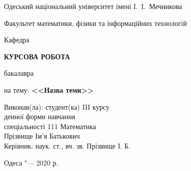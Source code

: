\thispagestyle{empty}

\begin{center}
Одеський національний університет імені І.~І.~Мечникова

Факультет математики, фізики та інформаційних технологій

Кафедра %
\end{center}

\vfill

\begin{center}
\large
\textbf{КУРСОВА РОБОТА}

бакалавра

\bigskip

на тему: \textbf{<<Назва теми>>}
\end{center}

\vspace{2cm}

\hfill
\begin{minipage}{0.6\textwidth}
Виконав(ла): студент(ка) III курсу\\
денної форми навчання\\
спеціальності 111 Математика\\ %
Прізвище Ім'я Батькович\\[3\jot]
Керівник: наук. ст., вч. зв. Прізвище І. Б.
\end{minipage}

\vfill

\begin{center}
Одеса "--- 2020 р.
\end{center}